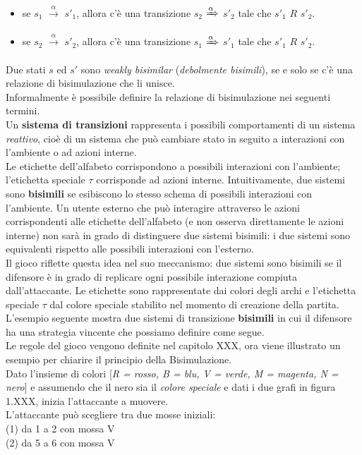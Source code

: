\documentclass[a4paper,11pt,twoside,openright]{report}
\begin{document}
\begin{itemize}
\item se $s_1$ $\xrightarrow{\alpha}$ $s'_1$, allora c'è una transizione $s_2$ $\xRightarrow{\alpha}$ $s'_2$ tale che $s'_1$ $R$ $s'_2$.

\item se $s_2$ $\xrightarrow{\alpha}$ $s'_2$, allora c'è una transizione $s_1$ $\xRightarrow{\alpha}$ $s'_1$ tale che $s'_1$ $R$ $s'_2$.
\end{itemize}

Due stati $s$ ed $s'$ sono \textit{weakly bisimilar} (\textit{debolmente bisimili}), se e solo se c'è una relazione di bisimulazione che li unisce.\\


Informalmente è possibile definire la relazione di bisimulazione nei seguenti termini.\\
Un \textbf{sistema di transizioni} rappresenta i possibili comportamenti di un sistema \textit{reattivo}, cioè di un sistema che può cambiare stato in seguito a interazioni con l'ambiente o ad azioni interne.\\
Le etichette dell'alfabeto corrispondono a possibili interazioni con l'ambiente; l'etichetta speciale $\tau$ corrisponde ad azioni interne. Intuitivamente, due sistemi sono \textbf{bisimili} se esibiscono lo stesso schema di possibili interazioni con l'ambiente. Un utente esterno che può interagire attraverso le azioni corrispondenti alle etichette dell'alfabeto (e non osserva direttamente le azioni interne) non sarà in grado di distinguere due sistemi bisimili: i due sistemi sono equivalenti rispetto alle possibili interazioni con l'esterno.\\
Il gioco riflette questa idea nel suo meccanismo: due sistemi sono bisimili se il difensore è in grado di replicare ogni possibile interazione compiuta dall'attaccante. Le etichette sono rappresentate dai colori degli archi e l'etichetta speciale $\tau$ dal colore speciale stabilito nel momento di creazione della partita.\\
L'esempio seguente mostra due sistemi di transizione \textbf{bisimili} in cui il difensore ha una strategia vincente che possiamo definire come segue.\\
Le regole del gioco vengono definite nel capitolo XXX, ora viene illustrato un esempio per chiarire il principio della Bisimulazione.\\
Dato l'insieme di colori [\textit{R = rosso, B = blu, V = verde, M = magenta, N = nero}] e assumendo che il nero sia il \textit{colore speciale} e dati i due grafi in figura 1.XXX, inizia l'attaccante a muovere.\\
L'attaccante può scegliere tra due mosse iniziali:\\
(1) da 1 a 2 con mossa V\\
(2) da 5 a 6 con mossa V\\
\end{document}
